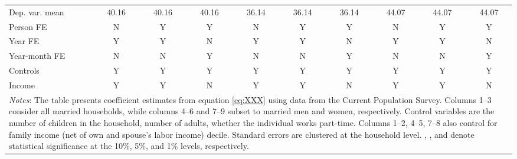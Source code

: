 {\begin{tabular}{l*{9}{c}}
Dep. var. mean      &       40.16         &       40.16         &       40.16         &       36.14         &       36.14         &       36.14         &       44.07         &       44.07         &       44.07         \\
Person FE           &           N         &           Y         &           Y         &           N         &           Y         &           Y         &           N         &           Y         &           Y         \\
Year FE             &           Y         &           Y         &           N         &           Y         &           Y         &           N         &           Y         &           Y         &           N         \\
Year-month FE       &           N         &           N         &           Y         &           N         &           N         &           Y         &           N         &           N         &           Y         \\
Controls            &           Y         &           Y         &           Y         &           Y         &           Y         &           Y         &           Y         &           Y         &           Y         \\
Income              &           Y         &           Y         &           N         &           Y         &           Y         &           N         &           Y         &           Y         &           N         \\
\bottomrule
\multicolumn{10}{p{17cm}}{\footnotesize \textit{Notes}: The table presents coefficient estimates from equation \ref{eq:XXX} using data from the Current Population Survey. Columns 1--3 consider all married households, while columns 4--6 and 7--9 subset to married men and women, respectively. Control variables are the number of children in the household, number of adults, whether the individual works part-time. Columns 1--2, 4--5, 7--8 also control for family income (net of own and spouse's labor income) decile. Standard errors are clustered at the household level. \sym{*}, \sym{**}, and \sym{***} denote statistical significance at the 10\%, 5\%, and 1\% levels, respectively.}\\
\end{tabular}
}
